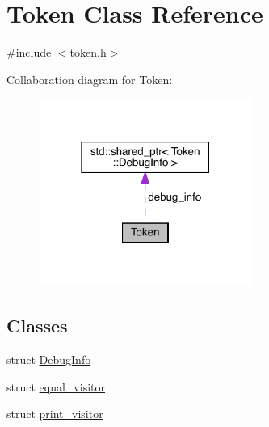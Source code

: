 \hypertarget{class_token}{}\section{Token Class Reference}
\label{class_token}


{\ttfamily \#include $<$token.\+h$>$}



Collaboration diagram for Token\+:\nopagebreak
\begin{figure}[H]
\begin{center}
\leavevmode
\includegraphics[width=198pt]{class_token__coll__graph}
\end{center}
\end{figure}
\subsection*{Classes}
\begin{DoxyCompactItemize}
\item 
struct \hyperlink{struct_token_1_1_debug_info}{Debug\+Info}
\item 
struct \hyperlink{struct_token_1_1equal__visitor}{equal\+\_\+visitor}
\item 
struct \hyperlink{struct_token_1_1print__visitor}{print\+\_\+visitor}
\end{DoxyCompactItemize}
